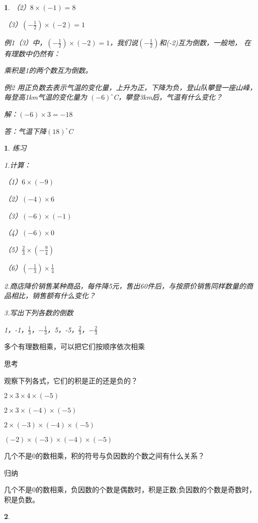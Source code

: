 \documentclass{article}
\newtheorem{exercise}{ }
\newtheorem{example}{ }
\begin{document}
\begin{article}
\begin{example}
（2）$8\times(-1)=8$

（3）$(-\frac{1}{2})\times(-2)=1$

例1（3）中，$(-\frac{1}{2})\times(-2)=1$，我们说$(-\frac{1}{2})$和(-2)互为倒数，一般地，
在有理数中仍然有：

乘积是1的两个数互为倒数。

例2 用正负数去表示气温的变化量，上升为正，下降为负，登山队攀登一座山峰，每登高1km气温的变化量为
$(-6)^\circ$C，攀登3km后，气温有什么变化？

解：$(-6)\times3=-18$

答：气温下降$(18)^\circ$C

\end{example}

\begin{exercise}

练习

1.计算：

（1）$6\times(-9)$

（2）$(-4)\times6$

（3）$(-6)\times(-1)$

（4）$(-6)\times0$

（5）$\frac{2}{3}\times(-\frac{9}{4})$

（6）$(-\frac{1}{3})\times\frac{1}{4}$

2.商店降价销售某种商品，每件降5元，售出60件后，与按原价销售同样数量的商品相比，销售额有什么变化？

3.写出下列各数的倒数

1，-1，$\frac{1}{3}$，$-\frac{1}{3}$，5，-5，$\frac{2}{3}$，$-\frac{2}{3}$

\end{exercise}

多个有理数相乘，可以把它们按顺序依次相乘

思考

观察下列各式，它们的积是正的还是负的？

$2\times3\times4\times(-5)$

$2\times3\times(-4)\times(-5)$

$2\times(-3)\times(-4)\times(-5)$

$(-2)\times(-3)\times(-4)\times(-5)$

几个不是0的数相乘，积的符号与负因数的个数之间有什么关系？

归纳

几个不是0的数相乘，负因数的个数是偶数时，积是正数;负因数的个数是奇数时，积是负数。

\begin{example}


\end{example}
\end{article}
\end{document}

